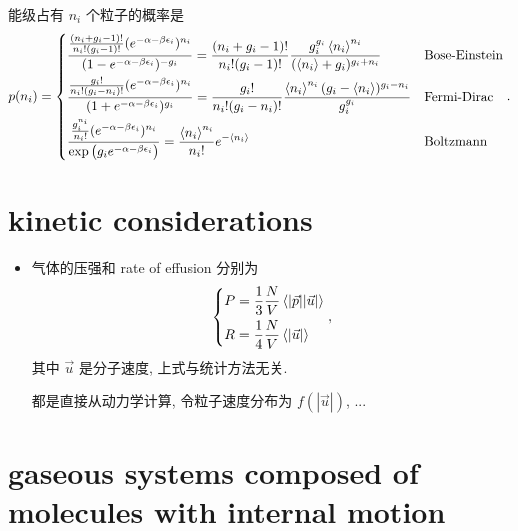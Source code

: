 \begin{itemize}
	\begin{tcolorbox}[title=calculation:]
		能级占有 $n_i$ 个粒子的概率是
		\begin{equation}
			p(n_i) = \begin{dcases}
				\frac{\frac{(n_i + g_i - 1)!}{n_i! (g_i - 1)!} (e^{- \alpha - \beta \epsilon_i})^{n_i}}{(1 - e^{- \alpha - \beta \epsilon_i})^{- g_i}} = \frac{(n_i + g_i - 1)!}{n_i! (g_i - 1)!} \frac{g_i^{g_i} \braket{n_i}^{n_i}}{(\braket{n_i} + g_i)^{g_i + n_i}} & \text{Bose-Einstein} \\
				\frac{\frac{g_i!}{n_i! (g_i - n_i)!} (e^{- \alpha - \beta \epsilon_i})^{n_i}}{(1 + e^{- \alpha - \beta \epsilon_i})^{g_i}} = \frac{g_i!}{n_i! (g_i - n_i)!} \frac{\braket{n_i}^{n_i} (g_i - \braket{n_i})^{g_i - n_i}}{g_i^{g_i}} & \text{Fermi-Dirac} \\
				\frac{\frac{g_i^{n_i}}{n_i!} (e^{- \alpha - \beta \epsilon_i})^{n_i}}{\exp \big( g_i e^{- \alpha - \beta \epsilon_i} \big)} = \frac{\braket{n_i}^{n_i}}{n_i!} e^{- \braket{n_i}} & \text{Boltzmann}
			\end{dcases}.
		\end{equation}
	\end{tcolorbox}
\end{itemize}

\section{kinetic considerations}
\begin{itemize}
	\item 气体的压强和 rate of effusion 分别为
	\begin{equation}
		\begin{dcases}
			P = \frac{1}{3} \frac{N}{V} \braket{|\vec{p}| |\vec{u}|} \\
			R = \frac{1}{4} \frac{N}{V} \braket{|\vec{u}|}
		\end{dcases},
	\end{equation}
	其中 $\vec{u}$ 是分子速度, 上式与统计方法无关.
	
	\begin{tcolorbox}[title=calculation:]
		都是直接从动力学计算, 令粒子速度分布为 $f(|\vec{u}|)$, ...
	\end{tcolorbox}
\end{itemize}

\section{gaseous systems composed of molecules with internal motion}
